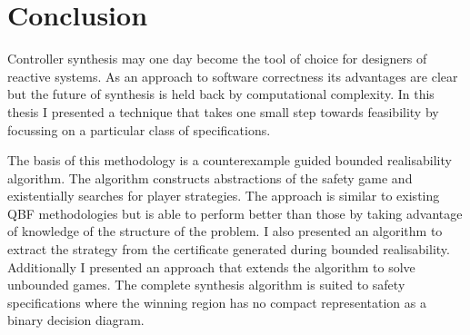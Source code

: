 \chapter{Conclusion}
\label{ch:conclusion}

Controller synthesis may one day become the tool of choice for designers of reactive systems. As an approach to software correctness its advantages are clear but the future of synthesis is held back by computational complexity. In this thesis I presented a technique that takes one small step towards feasibility by focussing on a particular class of specifications.

The basis of this methodology is a counterexample guided bounded realisability algorithm. The algorithm constructs abstractions of the safety game and existentially searches for player strategies. The approach is similar to existing QBF methodologies but is able to perform better than those by taking advantage of knowledge of the structure of the problem. I also presented an algorithm to extract the strategy from the certificate generated during bounded realisability. Additionally I presented an approach that extends the algorithm to solve unbounded games. The complete synthesis algorithm is suited to safety specifications where the winning region has no compact representation as a binary decision diagram.
